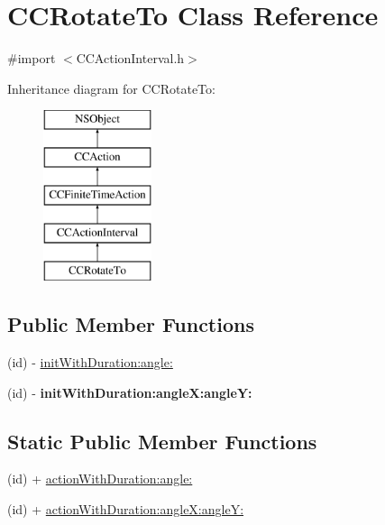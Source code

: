 \hypertarget{interface_c_c_rotate_to}{\section{C\-C\-Rotate\-To Class Reference}
\label{interface_c_c_rotate_to}
}


{\ttfamily \#import $<$C\-C\-Action\-Interval.\-h$>$}

Inheritance diagram for C\-C\-Rotate\-To\-:\begin{figure}[H]
\begin{center}
\leavevmode
\includegraphics[height=5.000000cm]{interface_c_c_rotate_to}
\end{center}
\end{figure}
\subsection*{Public Member Functions}
\begin{DoxyCompactItemize}
\item 
(id) -\/ \hyperlink{interface_c_c_rotate_to_a2e2cb5db25f4151fea779b3e838c7569}{init\-With\-Duration\-:angle\-:}
\item 
\hypertarget{interface_c_c_rotate_to_a2fed2bbffc4177667ab1a59a36765e31}{(id) -\/ {\bfseries init\-With\-Duration\-:angle\-X\-:angle\-Y\-:}}\label{interface_c_c_rotate_to_a2fed2bbffc4177667ab1a59a36765e31}

\end{DoxyCompactItemize}
\subsection*{Static Public Member Functions}
\begin{DoxyCompactItemize}
\item 
(id) + \hyperlink{interface_c_c_rotate_to_ae922800024b6ec26912e5e59c64fab7d}{action\-With\-Duration\-:angle\-:}
\item 
(id) + \hyperlink{interface_c_c_rotate_to_a4118b1733021915771488f15554c6007}{action\-With\-Duration\-:angle\-X\-:angle\-Y\-:}
\end{DoxyCompactItemize}
